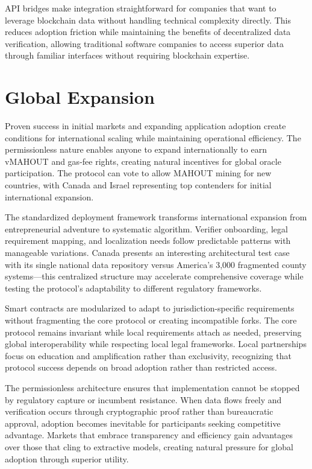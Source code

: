 API bridges make integration straightforward for companies that want to leverage blockchain data without handling technical complexity directly. This reduces adoption friction while maintaining the benefits of decentralized data verification, allowing traditional software companies to access superior data through familiar interfaces without requiring blockchain expertise.

\section{Global Expansion}

Proven success in initial markets and expanding application adoption create conditions for international scaling while maintaining operational efficiency. The permissionless nature enables anyone to expand internationally to earn vMAHOUT and gas-fee rights, creating natural incentives for global oracle participation. The protocol can vote to allow MAHOUT mining for new countries, with Canada and Israel representing top contenders for initial international expansion.

The standardized deployment framework transforms international expansion from entrepreneurial adventure to systematic algorithm. Verifier onboarding, legal requirement mapping, and localization needs follow predictable patterns with manageable variations. Canada presents an interesting architectural test case with its single national data repository versus America's 3,000 fragmented county systems---this centralized structure may accelerate comprehensive coverage while testing the protocol's adaptability to different regulatory frameworks.

Smart contracts are modularized to adapt to jurisdiction-specific requirements without fragmenting the core protocol or creating incompatible forks. The core protocol remains invariant while local requirements attach as needed, preserving global interoperability while respecting local legal frameworks. Local partnerships focus on education and amplification rather than exclusivity, recognizing that protocol success depends on broad adoption rather than restricted access.

The permissionless architecture ensures that implementation cannot be stopped by regulatory capture or incumbent resistance. When data flows freely and verification occurs through cryptographic proof rather than bureaucratic approval, adoption becomes inevitable for participants seeking competitive advantage. Markets that embrace transparency and efficiency gain advantages over those that cling to extractive models, creating natural pressure for global adoption through superior utility.


